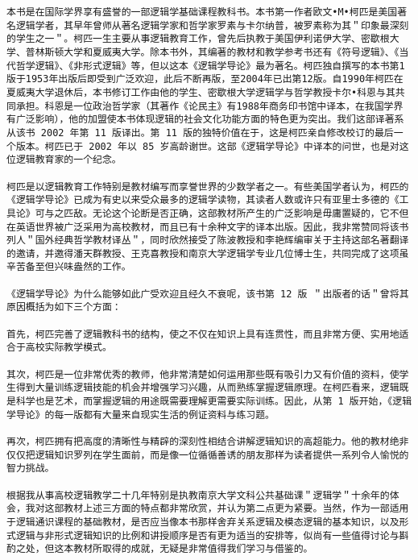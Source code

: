 \begin{verbatim}
本书是在国际学界享有盛誉的一部逻辑学基础课程教科书。本书第一作者欧文•M•柯匹是美国著名逻辑学者，其早年曾师从著名逻辑学家和哲学家罗素与卡尔纳普，被罗素称为其＂印象最深刻的学生之一＂。柯匹一生主要从事逻辑教育工作，曾先后执教于美国伊利诺伊大学、密歇根大学、普林斯顿大学和夏威夷大学。除本书外，其编著的教材和教学参考书还有《符号逻辑》、《当代哲学逻辑》、《非形式逻辑》等，但以这本《逻辑学导论》最为著名。柯匹独自撰写的本书第1版于1953年出版后即受到广泛欢迎，此后不断再版，至2004年已出第12版。自1990年柯匹在夏威夷大学退休后，本书修订工作由他的学生、密歇根大学逻辑学与哲学教授卡尔•科恩与其共同承担。科恩是一位政治哲学家（其著作《论民主》有1988年商务印书馆中译本，在我国学界有广泛影响），他的加盟使本书体现逻辑的社会文化功能方面的特色更为突出。我们这部译著系从该书 2002 年第 11 版译出。第 11 版的独特价值在于，这是柯匹亲自修改校订的最后一个版本。柯匹已于 2002 年以 85 岁高龄谢世。这部《逻辑学导论》中译本的问世，也是对这位逻辑教育家的一个纪念。

柯匹是以逻辑教育工作特别是教材编写而享誉世界的少数学者之一。有些美国学者认为，柯匹的《逻辑学导论》已成为有史以来受众最多的逻辑学读物，其读者人数或许只有亚里士多德的《工具论》可与之匹敌。无论这个论断是否正确，这部教材所产生的广泛影响是毋庸置疑的，它不但在英语世界被广泛采用为高校教材，而且已有十余种文字的译本出版。因此，我非常赞同将该书列人＂国外经典哲学教材译丛＂，同时欣然接受了陈波教授和李艳辉编审关于主持这部名著翻译的邀请，并邀得潘天群教授、王克喜教授和南京大学逻辑学专业几位博士生，共同完成了这项虽辛苦备至但兴味盎然的工作。

《逻辑学导论》为什么能够如此广受欢迎且经久不衰呢，该书第 12 版 ＂出版者的话＂曾将其原因概括为如下三个方面：

首先，柯匹完善了逻辑教科书的结构，使之不仅在知识上具有连贯性，而且非常方便、实用地适合于高校实际教学模式。

其次，柯匹是一位非常优秀的教师，他非常清楚如何运用那些既有吸引力又有价值的资料，使学生得到大量训练逻辑技能的机会并增强学习兴趣，从而熟练掌握逻辑原理。在柯匹看来，逻辑既是科学也是艺术，而掌握逻辑的用途既需要理解更需要实际训练。因此，从第 1 版开始，《逻辑学导论》的每一版都有大量来自现实生活的例证资料与练习题。

再次，柯匹拥有把高度的清晰性与精辟的深刻性相结合讲解逻辑知识的高超能力。他的教材绝非仅仅把逻辑知识罗列在学生面前，而是像一位循循善诱的朋友那样为读者提供一系列令人愉悦的智力挑战。

根据我从事高校逻辑教学二十几年特别是执教南京大学文科公共基础课＂逻辑学＂十余年的体会，我对这部教材上述三方面的特点都非常欣赏，并认为第二点更为紧要。当然，作为一部适用于逻辑通识课程的基础教材，是否应当像本书那样舍弃关系逻辑及模态逻辑的基本知识，以及形式逻辑与非形式逻辑知识的比例和讲授顺序是否有更为适当的安排等，似尚有一些值得讨论与斟酌之处，但这本教材所取得的成就，无疑是非常值得我们学习与借鉴的。


\end{verbatim}
